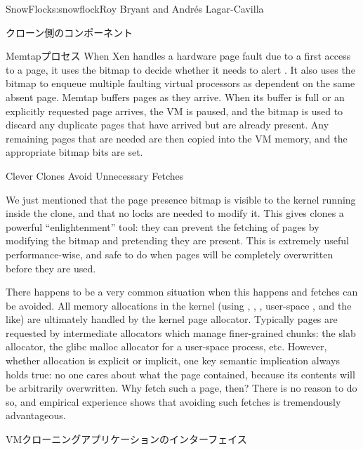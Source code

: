 \begin{aosachapter}{SnowFlock}{s:snowflock}{Roy Bryant and Andr\'e{s} Lagar-Cavilla}
\begin{aosasect1}{クローン側のコンポーネント}
\begin{aosasect2}{Memtapプロセス}
When Xen handles a hardware page fault due to a first access to a
page, it uses the bitmap to decide whether it needs to alert
. It also uses the bitmap to enqueue multiple faulting virtual
processors as dependent on the same absent page. Memtap buffers pages
as they arrive.  When its buffer is full or an explicitly requested
page arrives, the VM is paused, and the bitmap is used to discard any
duplicate pages that have arrived but are already present. Any
remaining pages that are needed are then copied into the VM memory,
and the appropriate bitmap bits are set.

\end{aosasect2}

\begin{aosasect2}{Clever Clones Avoid Unnecessary Fetches}

We just mentioned that the page presence bitmap is visible to the
kernel running inside the clone, and that no locks are needed to
modify it. This gives clones a powerful ``enlightenment'' tool: they can prevent the
fetching of pages by modifying the bitmap and pretending they are
present. This is extremely useful performance-wise, and safe to do
when pages will be completely overwritten before they are used.

There happens to be a very common situation when this happens and
fetches can be avoided. All memory allocations in the kernel (using
, , ,
user-space , and the like) are ultimately
handled by the kernel page allocator. Typically pages are requested by
intermediate allocators which manage finer-grained chunks: the slab
allocator, the glibc malloc allocator for a user-space process,
etc. However, whether allocation is explicit or implicit,
one key semantic implication
always holds true: no one cares about what the page contained,
because its contents will be arbitrarily overwritten. Why
fetch such a page, then? There is no reason to do so, and empirical
experience shows that avoiding such fetches is tremendously
advantageous.

\end{aosasect2}

\end{aosasect1}

\begin{aosasect1}{VMクローニングアプリケーションのインターフェイス}


\end{aosasect1}
\end{aosachapter}
